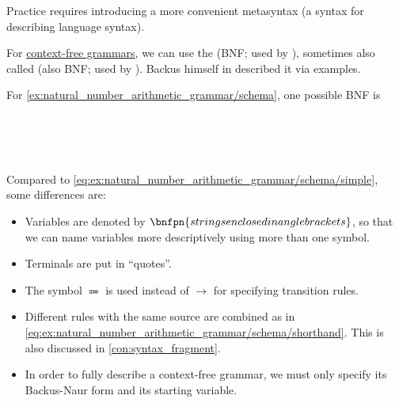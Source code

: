 \begin{remark}\label{con:backus_normal_form}
  Practice requires introducing a more convenient metasyntax (a syntax for describing language syntax).

  For \hyperref[def:chomsky_hierarchy/context_free]{context-free grammars}, we can use the  (BNF; used by \textcite[61]{Salomaa1973FormalLanguages}), sometimes also called  (also BNF; used by \textcite[40]{AhoEtAl2006Compilers}). Backus himself in \cite[5]{Backus1959Syntax} described it via examples.

  For \cref{ex:natural_number_arithmetic_grammar/schema}, one possible BNF is
  \begin{bnf*}
         { \bnfor \bnftsq{(} \bnfsp {} \bnfsp {} \bnfsp {} \bnfsp \bnftsq{)}} \\
          {\bnftsq{\( \synmult \)} \bnfor \bnftsq{\( \synmult \)}} \\
     { \bnfor {} \bnfor {} \bnfsp {}} \\
       { \bnfor {} \bnfsp {} \bnfor {} \bnfor {} \bnfsp {}}
  \end{bnf*}

  Compared to \eqref{eq:ex:natural_number_arithmetic_grammar/schema/simple}, some differences are:
  \begin{itemize}
    \item Variables are denoted by \( \bnfpn{strings enclosed in angle brackets} \), so that we can name variables more descriptively using more than one symbol.
    \item Terminals are put in \enquote{quotes}.
    \item The symbol \( \Coloneqq \) is used instead of \( \to \) for specifying transition rules.
    \item Different rules with the same source are combined as in \eqref{eq:ex:natural_number_arithmetic_grammar/schema/shorthand}. This is also discussed in \cref{con:syntax_fragment}.
    \item In order to fully describe a context-free grammar, we must only specify its Backus-Naur form and its starting variable.
  \end{itemize}
\end{remark}
